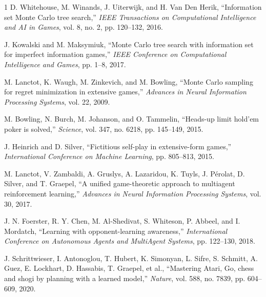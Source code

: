 \documentclass[conference]{IEEEtran}
\begin{document}
\begin{thebibliography}{1}
D. Whitehouse, M. Winands, J. Uiterwijk, and H. Van Den Herik, ``Information set Monte Carlo tree search,'' \textit{IEEE Transactions on Computational Intelligence and AI in Games}, vol. 8, no. 2, pp. 120--132, 2016.

J. Kowalski and M. Maksymiuk, ``Monte Carlo tree search with information set for imperfect information games,'' \textit{IEEE Conference on Computational Intelligence and Games}, pp. 1--8, 2017.

M. Lanctot, K. Waugh, M. Zinkevich, and M. Bowling, ``Monte Carlo sampling for regret minimization in extensive games,'' \textit{Advances in Neural Information Processing Systems}, vol. 22, 2009.

M. Bowling, N. Burch, M. Johanson, and O. Tammelin, ``Heads-up limit hold'em poker is solved,'' \textit{Science}, vol. 347, no. 6218, pp. 145--149, 2015.

J. Heinrich and D. Silver, ``Fictitious self-play in extensive-form games,'' \textit{International Conference on Machine Learning}, pp. 805--813, 2015.

M. Lanctot, V. Zambaldi, A. Gruslys, A. Lazaridou, K. Tuyls, J. Pérolat, D. Silver, and T. Graepel, ``A unified game-theoretic approach to multiagent reinforcement learning,'' \textit{Advances in Neural Information Processing Systems}, vol. 30, 2017.

J. N. Foerster, R. Y. Chen, M. Al-Shedivat, S. Whiteson, P. Abbeel, and I. Mordatch, ``Learning with opponent-learning awareness,'' \textit{International Conference on Autonomous Agents and MultiAgent Systems}, pp. 122--130, 2018.

J. Schrittwieser, I. Antonoglou, T. Hubert, K. Simonyan, L. Sifre, S. Schmitt, A. Guez, E. Lockhart, D. Hassabis, T. Graepel, et al., ``Mastering Atari, Go, chess and shogi by planning with a learned model,'' \textit{Nature}, vol. 588, no. 7839, pp. 604--609, 2020.

\end{thebibliography}
\end{document}
